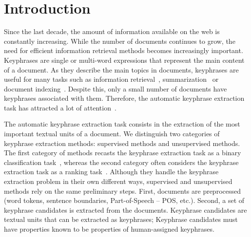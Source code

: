 \section{Introduction}
\label{sec:section}

  Since the last decade, the amount of information available on the web is constantly increasing.
  While the number of documents continues to grow, the need for efficient information retrieval methods becomes increasingly important.
  Keyphrases are single or multi-word expressions that represent the main content of a document.
  As they describe the main topics in documents, keyphrases are useful for many tasks such as information retrieval~\cite{turney1999learningalgorithms}, summarization~\cite{avanzo2005keyphrase} or document indexing~\cite{medelyan2008smalltrainingset}.
  Despite this, only a small number of documents have keyphrases associated with them.
  Therefore, the automatic keyphrase extraction task has attracted a lot of attention~\cite{kim2010semeval}.


  The automatic keyphrase extraction task consists in the extraction of the
  most important textual units of a document. We distinguish two categories of
  keyphrase extraction methods: supervised methods and unsupervised methods. The
  first category of methods recasts the keyphrase extraction task as a binary
  classification task~\cite{witten1999kea}, whereas the second category often
  considers the keyphrase extraction task as a ranking
  task~\cite{hassan2010conundrums}. Although they handle the keyphrase
  extraction problem in their own different ways, supervised and unsupervised
  methods rely on the same preliminary steps. First, documents are preprocessed
  (word tokens, sentence boundaries, Part-of-Speech -- POS, etc.). Second,
  a set of keyphrase candidates is extracted from the documents. Keyphrase
  candidates are textual units that can be extracted as keyphrases; Keyphrase
  candidates must have properties known to be properties of human-assigned
  keyphrases.
  
